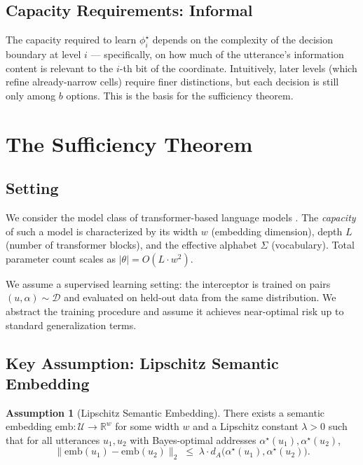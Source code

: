 \documentclass[11pt,a4paper]{article}
\theoremstyle{definition}
\newtheorem{assumption}[theorem]{Assumption}
\theoremstyle{remark}
\newcommand{\R}{\mathbb{R}}
\newcommand{\Uc}{\mathcal{U}}
\begin{document}
\subsection{Capacity Requirements: Informal}

The capacity required to learn $\phi_i^\star$ depends on the complexity of the decision boundary at level $i$ --- specifically, on how much of the utterance's information content is relevant to the $i$-th bit of the coordinate. Intuitively, later levels (which refine already-narrow cells) require finer distinctions, but each decision is still only among $b$ options. This is the basis for the sufficiency theorem.

\section{The Sufficiency Theorem}
\label{sec:sufficiency}

\subsection{Setting}

We consider the model class of transformer-based language models \citep{vaswani2017attention}. The \emph{capacity} of such a model is characterized by its width $w$ (embedding dimension), depth $L$ (number of transformer blocks), and the effective alphabet $\Sigma$ (vocabulary). Total parameter count scales as $|\theta| = O(L \cdot w^2)$.

We assume a supervised learning setting: the interceptor is trained on pairs $(u, \alpha) \sim \mathcal{D}$ and evaluated on held-out data from the same distribution. We abstract the training procedure and assume it achieves near-optimal risk up to standard generalization terms.

\subsection{Key Assumption: Lipschitz Semantic Embedding}

\begin{assumption}[Lipschitz Semantic Embedding]
\label{assum:lipschitz}
There exists a semantic embedding $\mathrm{emb}: \Uc \to \R^w$ for some width $w$ and a Lipschitz constant $\lambda > 0$ such that for all utterances $u_1, u_2$ with Bayes-optimal addresses $\alpha^\star(u_1), \alpha^\star(u_2)$,
\[
\|\mathrm{emb}(u_1) - \mathrm{emb}(u_2)\|_2 \;\leq\; \lambda \cdot d_A\bigl(\alpha^\star(u_1), \alpha^\star(u_2)\bigr).
\]
\end{assumption}
\end{document}
